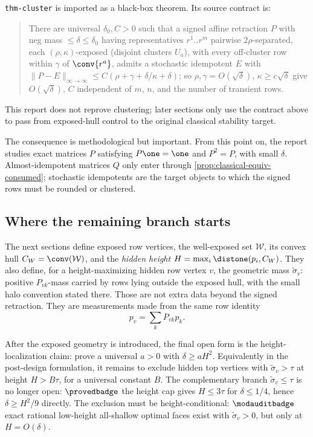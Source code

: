 \begin{proposition}
\provedbadge
\label{prop:cluster-consumed}
\texttt{thm-cluster} is imported as a black-box theorem.  Its source
contract is:
\begin{quote}\small
There are universal \(\delta_0,C>0\) such that a signed affine
retraction \(P\) with neg mass \(\leq\delta\leq\delta_0\) having
representatives \(r^1..r^m\) pairwise \(2\rho\)-separated, each
\((\rho,\kappa)\)-exposed (disjoint clusters \(U_a\)), with every
off-cluster row within \(\gamma\) of \(\conv\{r^a\}\), admits a
stochastic idempotent \(E\) with
\(\lVert P-E\rVert_{\infty\to\infty}\leq
C(\rho+\gamma+\delta/\kappa+\delta)\); so
\(\rho,\gamma=O(\sqrt\delta)\), \(\kappa\geq c\sqrt\delta\) give
\(O(\sqrt\delta)\), \(C\) independent of \(m\), \(n\), and the number of
transient rows.
\end{quote}
This report does not reprove clustering; later sections only use the
contract above to pass from exposed-hull control to the original
classical stability target.
\end{proposition}

The consequence is methodological but important.  From this point on,
the report studies exact matrices \(P\) satisfying \(P\one=\one\) and
\(P^2=P\), with small \(\delta\).  Almost-idempotent matrices \(Q\) only
enter through \cref{prop:classical-equiv-consumed}; stochastic
idempotents are the target objects to which the signed rows must be
rounded or clustered.

\subsection{Where the remaining branch starts}

The next sections define exposed row vertices, the well-exposed set
\(\mathcal W\), its convex hull \(C_W=\conv(\mathcal W)\), and the
\emph{hidden height} \(H=\max_i\distone(p_i,C_W)\).  They also define,
for a height-maximizing hidden row vertex \(v\), the geometric mass
\(\widetilde\sigma_v\): positive \(P_{vk}\)-mass carried by rows lying
outside the exposed hull, with the small halo convention stated there.
Those are not extra data beyond the signed retraction.  They are
measurements made from the same row identity
\[
  p_v=\sum_k P_{vk}p_k.
\]

\begin{openproblem}
\openbadge
\label{op:residual-branch-preview}
After the exposed geometry is introduced, the final open form is the
height-localization claim: prove a universal \(a>0\) with
\(\delta\ge aH^2\).  Equivalently in the post-design formulation, it
remains to exclude hidden top vertices with
\(\widetilde\sigma_v>\tau\) at height \(H>B\tau\), for a universal
constant \(B\).  The complementary branch
\(\widetilde\sigma_v\le\tau\) is no longer open:
\(\provedbadge\) the height cap gives \(H\le 3\tau\) for
\(\delta\le 1/4\), hence \(\delta\ge H^2/9\) directly.  The exclusion
must be height-conditional:
\(\modauditbadge\) exact rational low-height all-shallow optimal faces
exist with \(\widetilde\sigma_v>0\), but only at \(H=O(\delta)\).
\end{openproblem}

